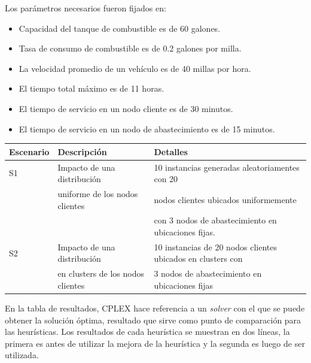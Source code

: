 \documentclass[letter, 10pt]{article}
\begin{document}
\begin{itemize}
Los parámetros necesarios fueron fijados en:
\begin{itemize}
\item Capacidad del tanque de combustible es de 60 galones.
\item Tasa de consumo de combustible es de 0.2 galones por milla.
\item La velocidad promedio de un vehículo es de 40 millas por hora.
\item El tiempo total máximo es de 11 horas.
\item El tiempo de servicio en un nodo cliente es de 30 minutos.
\item El tiempo de servicio en un nodo de abastecimiento es de 15 minutos.
\end{itemize}

\begin{tabular}{|l|l|l|}
\hline
Escenario & Descripción & Detalles \\
\hline
S1 	& Impacto de una distribución	 & 10 instancias generadas aleatoriamentes con 20  \\
	& uniforme de los nodos clientes & nodos clientes ubicados uniformemente  \\
	&&con 3 nodos de abastecimiento en ubicaciones fijas. \\ \hline
S2 	& Impacto de una distribución 		& 10 instancias de 20 nodos clientes ubicados en clusters con \\
	& en clusters de los nodos clientes	& 3 nodos de abastecimiento en ubicaciones fijas \\
	\hline
\end{tabular}

\newpage
En la tabla de resultados, CPLEX hace referencia a un \textit{solver} con el que se puede obtener la solución óptima,
resultado que sirve como punto de comparación para las heurísticas. Los resultados de cada heurística se muestran
en dos líneas, la primera es antes de utilizar la mejora de la heurística y la segunda es luego de ser utilizada.


\end{itemize}
\end{document}

